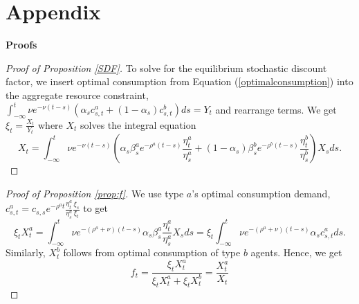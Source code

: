 \documentclass[preprint,11pt,authoryear]{elsarticle}
\theoremstyle{plain}
\begin{document}
\section{Appendix}\label{sec:Appendix}
\textbf{Proofs}
\begin{proof}[Proof of Proposition \ref{SDF}]
To solve for the  equilibrium stochastic discount factor, we insert optimal consumption from Equation (\ref{optimalconsumption}) into the aggregate resource constraint, $\int_{-\infty}^{t} \nu e^{-\nu (t-s )} (\alpha_s c^a_{s,t}+(1-\alpha_s) c^b_{s,t}) ds =  Y_t$ and rearrange terms. We get $\xi_t = \frac{X_t}{Y_t}$ where $X_t$ solves the integral equation 
\begin{equation}\label{eq:Xtapp}
	X_t =\int_{-\infty}^{t} \nu e^{-\nu \left(t-s\right)} \left(\alpha_s \beta^a_s e^{-\rho^a \left(t-s\right)}\frac{\eta^a_t}{\eta^a_s} +\left(1-\alpha_s\right)\beta^b_s e^{-\rho^b \left(t-s\right)} \frac{\eta^b_t}{\eta^b_s}\right)X_s ds.
\end{equation}
\end{proof}
\begin{proof}[Proof of Proposition \ref{prop:f}]
We use type $a$'s optimal consumption demand, $c^a_{s,t} = c_{s,s}e^{-\rho^a t} \frac{\eta^a_t}{\eta^a_s} \frac{\xi_s}{\xi_t}$ to get
\begin{equation}
    \xi_t X^a_t =  \int_{-\infty}^{t} \nu e^{-\left(\rho^a + \nu\right)\left(t-s\right)}\alpha_s \beta^a_s \frac{\eta^a_t}{\eta^a_s}X_s ds = \xi_t\int_{-\infty}^{t} \nu e^{-\left(\rho^a + \nu\right)\left(t-s\right)}\alpha_s c^a_{s,t} ds.
\end{equation}
Similarly, $X^b_t$ follows from optimal consumption of type $b$ agents. Hence, we get
\begin{equation}
    f_t = \frac{ \xi_t X^a_t }{  \xi_t X^a_t +  \xi_t X^b_t } =   \frac{X^a_t }{ X_t } 
\end{equation}
\end{proof}
\end{document}
